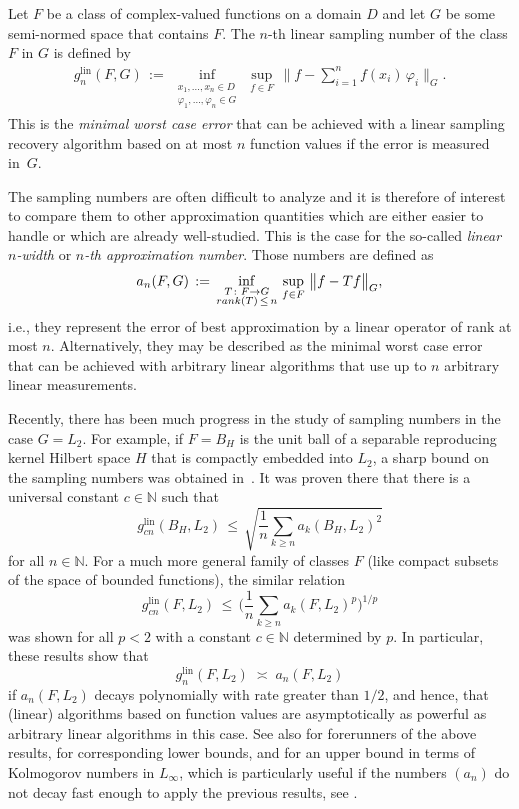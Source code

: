 \documentclass[a4paper,12pt]{amsart}
\theoremstyle{definition}
\theoremstyle{remark}
\newcommand{\lin}{\ensuremath{\mathrm{lin}}}
\begin{document}
Let $F$ be a class of complex-valued functions on a domain $D$
and let $G$ be some semi-normed space that contains $F$.
The $n$-th linear sampling number of the class $F$ in $G$ is defined by
\begin{align*}
g_n^{\lin}(F,G) \,:=\, 
\inf_{\substack{x_1,\dots,x_n\in {D}\\ \varphi_1,\dots,\varphi_n\in G}}\, 
\sup_{f\in F}\, 
\Big\|f - \sum_{i=1}^n f(x_i)\, \varphi_i\Big\|_G.
\end{align*}
This is the \emph{minimal worst case error} that 
can be achieved with 
a linear sampling recovery algorithm
based on at most $n$ function values 
if the error is measured in~$G$. 

The sampling numbers are often difficult to analyze
and it is therefore of interest to compare them to other approximation quantities
which are either easier to handle or which are already well-studied.
This is the case for the so-called
\emph{linear $n$-width} or \emph{$n$-th approximation number}. 
Those numbers are defined as
\begin{equation}\label{appnu}
a_n(F, G) \,:=\,
\inf_{\substack{T\colon F \to G\\ {\rm rank}(T) \,\le\, n}}\, 
\sup_{f\in F}\, 
\big\|f - Tf \big\|_{G},
\end{equation}
i.e., they represent the error of best approximation by a {linear} operator of rank at most $n$.
Alternatively, they may be described as
the minimal worst case error %
that can be achieved with arbitrary linear algorithms
that use up to $n$ arbitrary linear measurements. 

Recently, there has been much progress in the study of sampling numbers in the case $G=L_2$.
For example,
if $F=B_H$ is the unit ball of a separable reproducing kernel Hilbert space $H$
that is compactly embedded into $L_2$,
a sharp bound on the sampling numbers was obtained in~\cite{DKU}. 
It was proven there that there is a universal constant $c\in\mathbb{N}$ such that 
\begin{equation*}%
g_{cn}^\lin(B_H,L_2) \,\le\, \sqrt{ \frac{1}{n} \sum_{k\ge n} a_k(B_H,L_2)^2 }
\end{equation*}
for all $n\in\mathbb{N}$.
For a much more general family of classes $F$ 
(like compact subsets of the space of bounded functions),
the similar relation
\begin{equation}\label{eq:DKU-general}
g_{cn}^\lin(F,L_2) \,\le\, \bigg( \frac{1}{n} \sum_{k\ge n} a_k(F,L_2)^p \bigg)^{1/p}
\end{equation}
was shown for all $p<2$ with a constant $c\in\mathbb{N}$ determined by $p$.
In particular, these results show that 
\[
g_{n}^\lin(F,L_2) \;\asymp\; a_n(F,L_2)
\]
if $a_n(F,L_2)$ decays polynomially with rate greater than $1/2$, 
and hence, that (linear) algorithms based on function values
are asymptotically as powerful as arbitrary linear algorithms 
in this case. 
See also \cite{KU1,KU2,KWW,NSU} for forerunners of the above results,  
\cite{HNV,HKNV,KV} for corresponding lower bounds, 
and \cite{T20} for an upper bound in terms of Kolmogorov numbers in $L_\infty$, 
which is particularly useful if the numbers $(a_n)$ 
do not decay fast enough to apply the previous results, see \cite{TU1}. 
\end{document}
